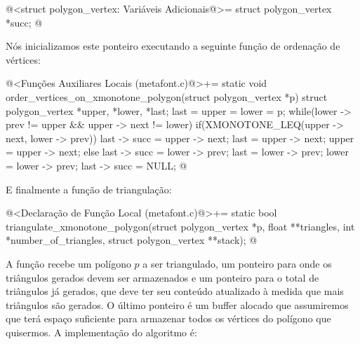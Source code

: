 {{{{{{\iniciocodigo
@<struct polygon\_vertex: Variáveis Adicionais@>=
  struct polygon_vertex *succ;
@
\fimcodigo

Nós inicializamos este ponteiro executando a seguinte função de
ordenação de vértices:

\iniciocodigo
@<Funções Auxiliares Locais (metafont.c)@>+=
static void order_vertices_on_xmonotone_polygon(struct polygon_vertex *p){
  struct polygon_vertex *upper, *lower, *last;
  last = upper = lower = p;
  while(lower -> prev != upper && upper -> next != lower){
    if(XMONOTONE_LEQ(upper -> next, lower -> prev)){
      last -> succ = upper -> next;
      last = upper -> next;
      upper = upper -> next;
    }
    else{
      last -> succ = lower -> prev;
      last = lower -> prev;
      lower = lower -> prev;
    }
  }
  last -> succ = NULL;
}
@
\fimcodigo

E finalmente a função de triangulação:

\iniciocodigo
@<Declaração de Função Local (metafont.c)@>+=
static bool triangulate_xmonotone_polygon(struct polygon_vertex *p,
                                          float **triangles,
                                          int *number_of_triangles,
                                          struct polygon_vertex **stack);
@
\fimcodigo

A função recebe um polígono $p$ a ser triangulado, um ponteiro para
onde os triângulos gerados devem ser armazenados e um ponteiro para o
total de triângulos já gerados, que deve ter seu conteúdo atualizado à
medida que mais triângulos são gerados. O último ponteiro é um buffer
alocado que assumiremos que terá espaço suficiente para armazenar
todos os vértices do polígono que quisermos. A implementação do
algoritmo é:

}}}}}}
